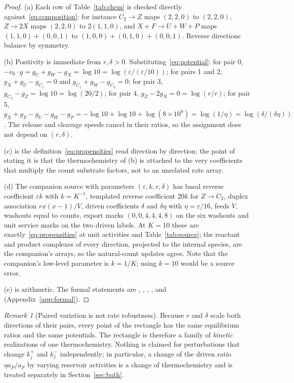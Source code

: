 \documentclass[11pt,a4paper]{article}
\theoremstyle{plain}
\theoremstyle{definition}
\theoremstyle{remark}
\newtheorem{remark}[theorem]{Remark}
\newcommand{\eps}{\varepsilon}
\begin{document}
\begin{proof}
(a) Each row of Table~\ref{tab:chem} is checked directly against~\eqref{eq:composition}: for instance $C_2\to Z$ maps $(2,2,0)$ to $(2,2,0)$, $Z\to2X$ maps $(2,2,0)$ to $2(1,1,0)$, and $X+F\to U+W+P$ maps $(1,1,0)+(0,0,1)$ to $(1,0,0)+(0,1,0)+(0,0,1)$. Reverse directions balance by symmetry.

(b) Positivity is immediate from $r,\delta>0$. Substituting~\eqref{eq:potential}: for pair 0, $-\nu_0\cdot g=g_U+g_W-g_X=\log10=\log(\eps/(\eps/10))$; for pairs 1 and 2, $g_X+g_U-g_{C_1}=0$ and $g_{C_1}+g_W-g_{C_2}=0$; for pair 3, $g_{C_2}-g_Z=\log10=\log(20/2)$; for pair 4, $g_Z-2g_X=0=\log(r/r)$; for pair 5, $g_X+g_F-g_U-g_W-g_P=-\log10+\log10+\log(8\times10^9)=\log(1/\eta)=\log(\delta/(\delta\eta))$. The release and cleavage speeds cancel in their ratios, so the assignment does not depend on $(r,\delta)$.

(c) is the definition~\eqref{eq:propensities} read direction by direction; the point of stating it is that the thermochemistry of (b) is attached to the very coefficients that multiply the count substrate factors, not to an unrelated rate array.

(d) The companion source with parameters $(\eps,k,r,\delta)$ has basal reverse coefficient $\eps k$ with $k=K^{-1}$, templated reverse coefficient $20k$ for $Z\to C_2$, duplex association $rx(x-1)/V$, driven coefficients $\delta$ and $\delta\eta$ with $\eta=\eps/16$, feeds $V$, washouts equal to counts, export marks $(0,0,4,4,4,8)$ on the six washouts and unit service marks on the two driven labels. At $K=10$ these are exactly~\eqref{eq:propensities} at unit activities and Table~\ref{tab:source}; the reactant and product complexes of every direction, projected to the internal species, are the companion's arrays, so the natural-count updates agree. Note that the companion's low-level parameter is $k=1/K$; using $k=10$ would be a source error.

(e) is arithmetic. The formal statements are , , , ,  and  (Appendix~\ref{app:formal}).
\end{proof}

\begin{remark}[Paired variation is not rate robustness]\label{rem:paired}
Because $r$ and $\delta$ scale both directions of their pairs, every point of the rectangle has the same equilibrium ratios and the same potentials. The rectangle is therefore a family of \emph{kinetic} realizations of one thermochemistry. Nothing is claimed for perturbations that change $k_j^+$ and $k_j^-$ independently; in particular, a change of the driven ratio $\eta a_P/a_F$ by varying reservoir activities is a change of thermochemistry and is treated separately in Section~\ref{sec:bath}.
\end{remark}
\end{document}

